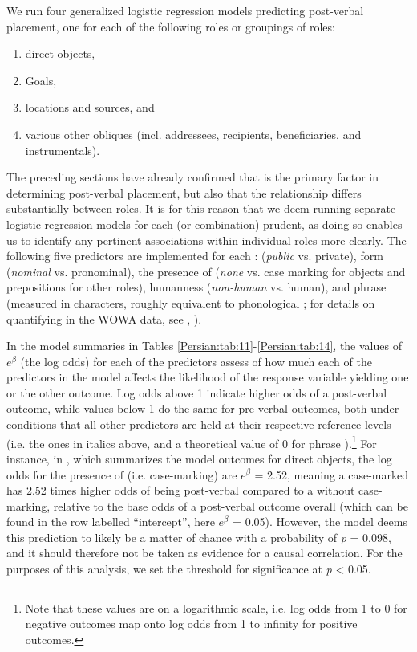 \documentclass[output=paper,colorlinks,citecolor=brown,draftmode]{langscibook}
\begin{document}
We run four generalized logistic regression models predicting post-verbal placement, one for each of the following roles or groupings of roles: 
\begin{enumerate}[label=(\roman*)]
 \item direct objects, 
 \item Goals, 
 \item locations and sources, and 
 \item various other obliques (incl. addressees, recipients, beneficiaries, and instrumentals).
\end{enumerate} 
The preceding sections have already confirmed that  is the primary factor in determining post-verbal placement, but also that the relationship differs substantially between roles. It is for this reason that we deem running separate logistic regression models for each  (or  combination) prudent, as doing so enables us to identify any pertinent associations within individual roles more clearly. The following five predictors are implemented for each :  (\textit{public} vs. private), form (\textit{nominal} vs. pronominal), the presence of  (\textit{none} vs. case marking for objects and prepositions for other roles), humanness (\textit{non-human} vs. human), and phrase  (measured in characters, roughly equivalent to phonological ; for details on quantifying  in the WOWA data, see , ).

In the model summaries in Tables \ref{Persian:tab:11}-\ref{Persian:tab:14}, the values of $e^\beta$ (the log odds) for each of the predictors assess of how much each of the predictors in the model affects the likelihood of the response variable yielding one or the other outcome. Log odds above 1 indicate higher odds of a post-verbal outcome, while values below 1 do the same for pre-verbal outcomes, both under conditions that all other predictors are held at their respective reference levels (i.e. the ones in italics above, and a theoretical value of 0 for phrase ).\footnote{Note that these values are on a logarithmic scale, i.e. log odds from 1 to 0 for negative outcomes map onto log odds from 1 to infinity for positive outcomes.} For instance, in , which summarizes the model outcomes for direct objects, the log odds for the presence of  (i.e. case-marking) are $e^\beta$ = 2.52, meaning a case-marked  has 2.52 times higher odds of being post-verbal compared to a  without case-marking, relative to the base odds of a post-verbal outcome overall (which can be found in the row labelled ``intercept'', here $e^\beta$ = 0.05). However, the model deems this prediction to likely be a matter of chance with a probability of \textit{p} = 0.098, and it should therefore not be taken as evidence for a causal correlation. For the purposes of this analysis, we set the threshold for significance at \textit{p} < 0.05.
\end{document}
